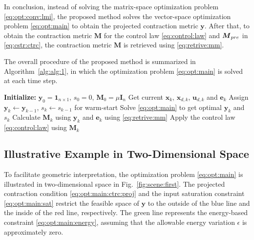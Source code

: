 \documentclass{ifacconf}
\newcommand*{\mv}[1]{\boldsymbol{#1}} %
\newcommand*{\mm}[1]{\boldsymbol{#1}} %
\begin{document}
In conclusion, instead of solving the matrix-space optimization problem \eqref{eq:opt:conv:lmi}, the proposed method solves the vector-space optimization problem \eqref{eq:opt:main} to obtain the projected contraction metric $\mv{y}$.
After that, to obtain the contraction metric $\mm{M}$ for the control law \eqref{eq:control:law} and $\mm{M}_{\rm{pre}}$ in \eqref{eq:cstr:ctrc}, the contraction metric $\mm{M}$ is retrieved using \eqref{eq:retrive:mm}.
   
The overall procedure of the proposed method is summarized in Algorithm~\ref{alg:alg:1}, in which the optimization problem \eqref{eq:opt:main} is solved at each time step.

\begin{algorithm}[!t]
   \caption{Proposed controller} \label{alg:alg:1}
   \begin{algorithmic}[1]
      \State \textbf{Initialize:} $\mv{y}_0=\mv{1}_{n\times 1}$, $s_0=0$, $\mm{M}_{0}=\mu\mm{I}_n$
            \State Get current $\mv{x}_k$, $\mv{x}_{d,k}$, $\mv{u}_{d,k}$ and $\mv{e}_k$
            \State Assign $\mv{y}_k \leftarrow \mv{y}_{k-1}$, $s_k \leftarrow s_{k-1}$ for warm-start
            \State Solve \eqref{eq:opt:main} to get optimal $\mv{y}_k$ and $s_k$
            \State Calculate $\mm{M}_{k}$ using $\mv{y}_k$ and $\mv{e}_k$ using \eqref{eq:retrive:mm}
            \State Apply the control law \eqref{eq:control:law} using $\mm{M}_{k}$
      \EndFor
   \end{algorithmic}
\end{algorithm}

\subsection{Illustrative Example in Two-Dimensional Space} \label{sec:sub:illustrative}


To facilitate geometric interpretation, the optimization problem \eqref{eq:opt:main} is illustrated in two-dimensional space in Fig.~\ref{fig:scene:first}.
The projected contraction condition \eqref{eq:opt:main:ctrc:proj} and the input saturation constraint \eqref{eq:opt:main:sat} restrict the feasible space of $\mv{y}$ to the outside of the blue line and the inside of the red line, respectively.
The green line represents the energy-based constraint \eqref{eq:opt:main:energy}, assuming that the allowable energy variation $\epsilon$ is approximately zero.
\end{document}
